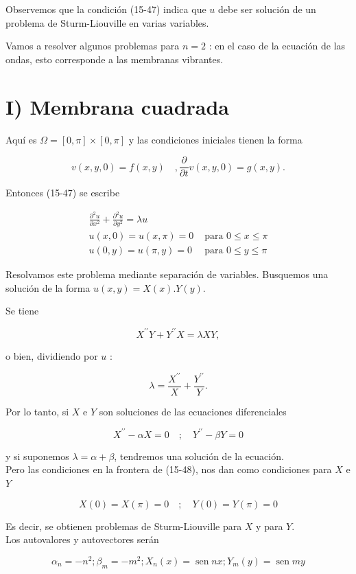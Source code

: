 \documentclass[10pt]{article}
\theoremstyle{plain}
\theoremstyle{definition}
\theoremstyle{remark}
\begin{document}
Observemos que la condición (15-47) indica que $u$ debe ser solución de un problema de Sturm-Liouville en varias variables.

Vamos a resolver algunos problemas para $n=2$ : en el caso de la ecuación de las ondas, esto corresponde a las membranas vibrantes.


\section*{I) Membrana cuadrada}
Aquí es $\Omega=[0, \pi] \times[0, \pi]$ y las condiciones iniciales tienen la forma

$$
v(x, y, 0)=f(x, y) \quad, \frac{\partial}{\partial t} v(x, y, 0)=g(x, y) .
$$

Entonces (15-47) se escribe

\[
\begin{array}{ll}
\frac{\partial^{2} u}{\partial x^{2}}+\frac{\partial^{2} u}{\partial y^{2}}=\lambda u & \\
u(x, 0)=u(x, \pi)=0 & \text { para } 0 \leqslant x \leqslant \pi \\
u(0, y)=u(\pi, y)=0 & \text { para } 0 \leqslant y \leqslant \pi \tag{15-48}
\end{array}
\]

Resolvamos este problema mediante separación de variables. Busquemos una solución de la forma $u(x, y)=X(x) . Y(y)$.

Se tiene

$$
X^{\prime \prime} Y+Y^{\prime \prime} X=\lambda X Y,
$$

o bien, dividiendo por $u$ :

$$
\lambda=\frac{X^{\prime \prime}}{X}+\frac{Y^{\prime \prime}}{Y} .
$$

Por lo tanto, si $X$ e $Y$ son soluciones de las ecuaciones diferenciales

$$
X^{\prime \prime}-\alpha X=0 \quad ; \quad Y^{\prime \prime}-\beta Y=0
$$

y si suponemos $\lambda=\alpha+\beta$, tendremos una solución de la ecuación.\\
Pero las condiciones en la frontera de (15-48), nos dan como condiciones para $X$ e $Y$

$$
X(0)=X(\pi)=0 \quad ; \quad Y(0)=Y(\pi)=0
$$

Es decir, se obtienen problemas de Sturm-Liouville para $X$ y para $Y$.\\
Los autovalores y autovectores serán

$$
\alpha_{n}=-n^{2} ; \beta_{m}=-m^{2} ; X_{n}(x)=\operatorname{sen} n x ; Y_{m}(y)=\operatorname{sen} m y
$$
\end{document}
